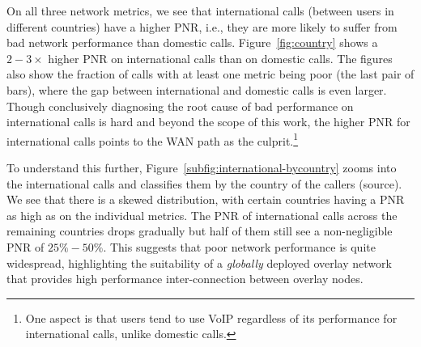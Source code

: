 On all three network metrics, we see that international 
calls (between users in different countries) have a
 higher PNR, i.e., they are more likely to suffer from 
 bad network performance than domestic calls. 
Figure~\ref{fig:country} shows a $2-3\times$ higher 
PNR on international calls than on domestic calls. 
The figures also show the fraction of calls with at least 
one metric being poor (the last pair of bars), where the 
gap between international and domestic calls is even 
larger. 
Though conclusively diagnosing the root cause of bad 
performance on international calls is hard and beyond 
the scope of this work, the higher PNR for international 
calls points to the WAN path as the culprit.\footnote{One 
aspect is that users tend to use VoIP 
regardless of its performance for international calls, 
unlike domestic calls.} %


To understand this further, 
Figure~\ref{subfig:international-bycountry} zooms into 
the international calls and classifies them by the country 
of the callers (source). 
We see that there is a skewed distribution, with certain 
countries having a PNR as high as on the individual metrics. 
The PNR of international calls across the remaining 
countries drops gradually but half of them still see a 
non-negligible PNR of $25\%-50\%$. 
This suggests that poor network performance is 
quite widespread, highlighting the suitability of a 
{\em globally} deployed overlay network that provides 
high performance inter-connection between overlay nodes.

